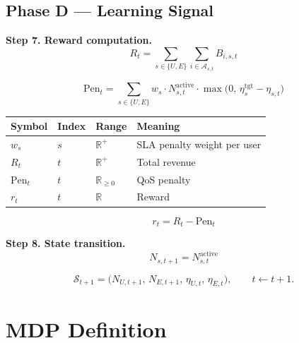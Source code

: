\documentclass[11pt]{article}
\begin{document}
\subsection*{Phase D --- Learning Signal}
\textbf{Step 7. Reward computation.}
\begin{equation}
R_t = \sum_{s \in \{U,E\}} \sum_{i \in \mathcal{A}_{s,t}} B_{i,s,t}
\tag{F8}
\end{equation}

\begin{equation}
\mathrm{Pen}_t = \sum_{s \in \{U,E\}} w_s \cdot N_{s,t}^{\mathrm{active}} \cdot \max\bigl(0,\, \eta_s^{\mathrm{tgt}} - \eta_{s,t}\bigr)
\tag{F9}
\end{equation}

\begin{longtable}{@{}llll@{}}
\toprule
Symbol & Index & Range & Meaning \\
\midrule
\endhead
$w_s$ & $s$ & $\mathbb{R}^{+}$ & SLA penalty weight per user \\
$R_t$ & $t$ & $\mathbb{R}^{+}$ & Total revenue \\
$\mathrm{Pen}_t$ & $t$ & $\mathbb{R}_{\ge 0}$ & QoS penalty \\
$r_t$ & $t$ & $\mathbb{R}$ & Reward \\
\bottomrule
\end{longtable}

\begin{equation}
\boxed{r_t = R_t - \mathrm{Pen}_t}
\tag{F10}
\end{equation}

\textbf{Step 8. State transition.}
\begin{equation}
N_{s,t+1} = N_{s,t}^{\mathrm{active}}
\tag{F11}
\end{equation}

\begin{equation*}
\mathcal{S}_{t+1} = \bigl(N_{U,t+1},\, N_{E,t+1},\, \eta_{U,t},\, \eta_{E,t}\bigr),
\qquad t \leftarrow t+1.
\end{equation*}

\section{MDP Definition}
\end{document}
